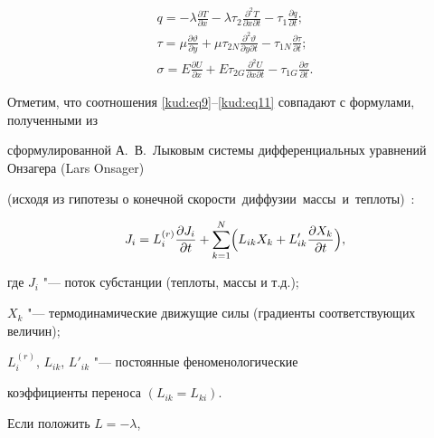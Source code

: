\begin{gather}

\label{kud:eq9}

q=-\lambda \frac{\partial T}{\partial x}-\lambda \tau

_2 \frac{\partial ^2T}{\partial x\partial t}- \tau_1

\frac{\partial q}{\partial t};\\

\label{kud:eq10}

 \tau= \mu \frac{\partial \vartheta }{\partial y}+ \mu

\tau_{2N} \frac{\partial^2 \vartheta }{\partial y\partial t}- \tau_{1N} \frac{\partial \tau}{\partial t};\\

\label{kud:eq11}

\sigma =E\frac{\partial U}{\partial x}+E \tau_{2G} \frac{\partial ^2U}{\partial x\partial t}- \tau_{1G} \frac{\partial  \sigma}{\partial t}.

\end{gather}



Отметим, что соотношения \eqref{kud:eq9}--\eqref{kud:eq11} совпадают с формулами, полученными из

сформулированной А.~В.~Лыковым системы дифференциальных уравнений Онзагера (Lars Onsager)

(исходя из гипотезы о конечной скорости~диффузии~массы~и~теплоты)~\cite{kud:bib8}:

\begin{equation}

\label{kud:eq12}

J_i =L_i^{(r)} \frac{\partial J_i }{\partial t}+

\sum\limits_{k=1}^N \Bigl(

L_{ik} X_k +L'_{ik} \frac{\partial X_k }{\partial t} \Bigr),

\end{equation}

где $J_i$ "--- поток субстанции (теплоты, массы и т.д.); 

$X_k$ "--- термодинамические движущие силы (градиенты соответствующих величин);

$L_i^{(r)}$, $L_{ik}$, $L'_{ik} $ "--- постоянные феноменологические

коэффициенты переноса $( L_{ik} =L_{ki} )$.



Если положить $L=- \lambda$,

